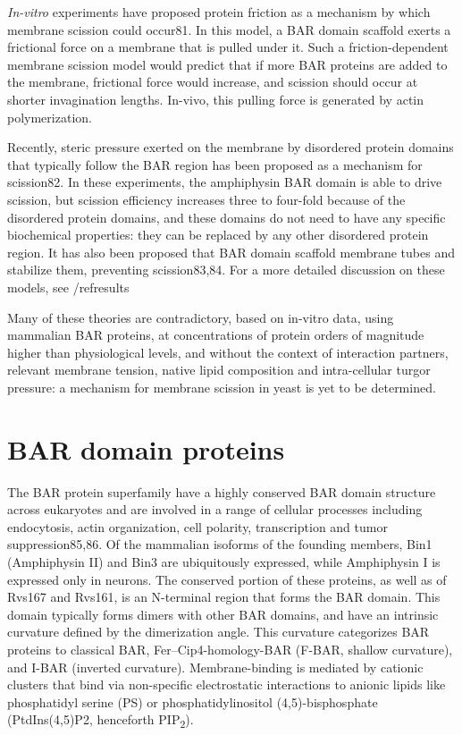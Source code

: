 			\vspace{5mm}
			\textit{In-vitro} experiments have proposed protein friction as a mechanism by which membrane scission could occur81. In this model, a BAR domain scaffold exerts a frictional force on a membrane that is pulled under it. Such a friction-dependent membrane scission model would predict that if more BAR proteins are added to the membrane, frictional force would increase, and scission should occur at shorter invagination lengths. In-vivo, this pulling force is generated by actin polymerization. 


			\vspace{5mm}
			Recently, steric pressure exerted on the membrane by disordered protein domains that typically follow the BAR region has been proposed as a mechanism for scission82. In these experiments, the amphiphysin BAR domain is able to drive scission, but scission efficiency increases three to four-fold because of the disordered protein domains, and these domains do not need to have any specific biochemical properties: they can be replaced by any other disordered protein region. It has also been proposed that BAR domain scaffold membrane tubes and stabilize them, preventing scission83,84. For a more detailed discussion on these models, see /ref{results}


			\vspace{5mm}
			Many of these theories are contradictory, based on in-vitro data, using mammalian BAR proteins, at concentrations of protein orders of magnitude higher than physiological levels, and without the context of interaction partners, relevant membrane tension, native lipid composition and intra-cellular turgor pressure: a mechanism for membrane scission in yeast is yet to be determined. 


		
\section{BAR domain proteins}
	
The BAR protein superfamily have a highly conserved BAR domain structure across eukaryotes and are involved in a range of cellular processes including endocytosis, actin organization, cell polarity, transcription and tumor suppression85,86. 
Of the mammalian isoforms of the founding members, Bin1 (Amphiphysin II) and Bin3 are ubiquitously expressed, while Amphiphysin I is expressed only in neurons. The conserved portion of these proteins, as well as of Rvs167 and Rvs161, is an N-terminal region that forms the BAR domain. This domain typically forms dimers with other BAR domains, and have an intrinsic curvature defined by the dimerization angle. This curvature categorizes BAR proteins to classical BAR, Fer–Cip4-homology-BAR (F-BAR, shallow curvature), and I-BAR (inverted curvature). Membrane-binding is mediated by cationic clusters that bind via non-specific electrostatic interactions to anionic lipids like phosphatidyl serine (PS) or phosphatidylinositol (4,5)-bisphosphate (PtdIns(4,5)P2, henceforth PIP\textsubscript{2}).

